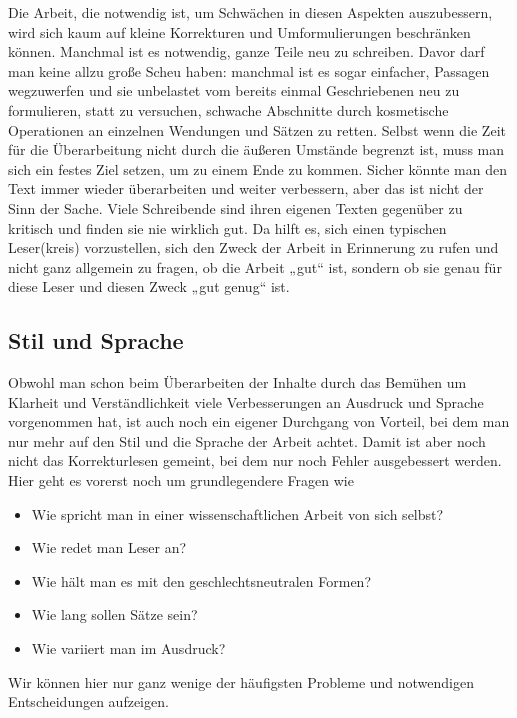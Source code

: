 \documentclass[]{book}
\providecommand{\tightlist}{%
  \setlength{\itemsep}{0pt}\setlength{\parskip}{0pt}}
\theoremstyle{definition}
\theoremstyle{definition}
\theoremstyle{definition}
\theoremstyle{remark}
\begin{document}
Die Arbeit, die notwendig ist, um Schwächen in diesen Aspekten
auszubessern, wird sich kaum auf kleine Korrekturen und Umformulierungen
beschränken können. Manchmal ist es notwendig, ganze Teile neu zu
schreiben. Davor darf man keine allzu große Scheu haben: manchmal ist es
sogar einfacher, Passagen wegzuwerfen und sie unbelastet vom bereits
einmal Geschriebenen neu zu formulieren, statt zu versuchen, schwache
Abschnitte durch kosmetische Operationen an einzelnen Wendungen und
Sätzen zu retten. Selbst wenn die Zeit für die Überarbeitung nicht durch
die äußeren Umstände begrenzt ist, muss man sich ein festes Ziel setzen,
um zu einem Ende zu kommen. Sicher könnte man den Text immer wieder
überarbeiten und weiter verbessern, aber das ist nicht der Sinn der
Sache. Viele Schreibende sind ihren eigenen Texten gegenüber zu kritisch
und finden sie nie wirklich gut. Da hilft es, sich einen typischen
Leser(kreis) vorzustellen, sich den Zweck der Arbeit in Erinnerung zu
rufen und nicht ganz allgemein zu fragen, ob die Arbeit „gut`` ist,
sondern ob sie genau für diese Leser und diesen Zweck „gut genug`` ist.

\subsection{Stil und Sprache}\label{stil-und-sprache}

Obwohl man schon beim Überarbeiten der Inhalte durch das Bemühen um
Klarheit und Verständlichkeit viele Verbesserungen an Ausdruck und
Sprache vorgenommen hat, ist auch noch ein eigener Durchgang von
Vorteil, bei dem man nur mehr auf den Stil und die Sprache der Arbeit
achtet. Damit ist aber noch nicht das Korrekturlesen gemeint, bei dem
nur noch Fehler ausgebessert werden. Hier geht es vorerst noch um
grundlegendere Fragen wie

\begin{itemize}
\tightlist
\item
  Wie spricht man in einer wissenschaftlichen Arbeit von sich selbst?
\item
  Wie redet man Leser an?
\item
  Wie hält man es mit den geschlechtsneutralen Formen?
\item
  Wie lang sollen Sätze sein?
\item
  Wie variiert man im Ausdruck?
\end{itemize}

Wir können hier nur ganz wenige der häufigsten Probleme und notwendigen
Entscheidungen aufzeigen.
\end{document}

